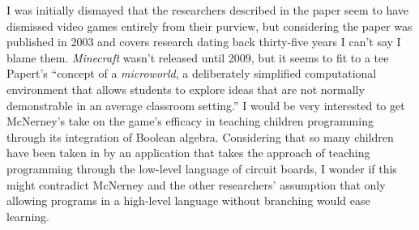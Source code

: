 \documentclass{abrice}
\begin{document}
I was initially dismayed that the researchers described in the paper seem to
have dismissed video games entirely from their purview, but considering the
paper was published in 2003 and covers research dating back thirty-five years I
can't say I blame them. \emph{Minecraft} wasn't released until 2009, but it
seems to fit to a tee Papert's ``concept of a \emph{microworld}, a deliberately
simplified computational environment that allows students to explore ideas that
are not normally demonstrable in an average classroom setting.'' I would be very
interested to get McNerney's take on the game's efficacy in teaching children
programming through its integration of Boolean algebra. Considering that so many
children have been taken in by an application that takes the approach of
teaching programming through the low-level language of circuit boards, I wonder
if this might contradict McNerney and the other researchers' assumption that
only allowing programs in a high-level language without branching would ease
learning.
\end{document}
